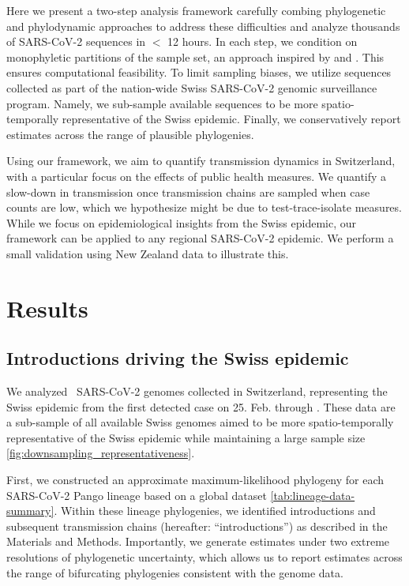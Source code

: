 \documentclass[9pt,twocolumn,twoside,lineno]{pnas-new}
\begin{document}
Here we present a two-step analysis framework carefully combing phylogenetic and phylodynamic approaches to  address these difficulties and analyze thousands of SARS-CoV-2 sequences in $<$ 12 hours. In each step, we condition on monophyletic partitions of the sample set, an approach inspired by  \cite{Muller2020} and \cite{DuPlessis}. This ensures computational feasibility. To limit sampling biases, we utilize sequences collected as part of the nation-wide Swiss SARS-CoV-2 genomic surveillance program. Namely, we sub-sample  available sequences to be more spatio-temporally representative of the Swiss epidemic. Finally, we conservatively report estimates across the range of plausible phylogenies.

Using our framework, we aim to quantify transmission dynamics in Switzerland, with a particular focus on the effects of public health measures. We quantify a slow-down in transmission once transmission chains are sampled when case counts are low, which we hypothesize might be due to test-trace-isolate measures. While we focus on epidemiological insights from the Swiss epidemic, our framework can be applied to any regional SARS-CoV-2 epidemic. We perform a small validation using New Zealand data to illustrate this. 

\section{Results}

\subsection{Introductions driving the Swiss epidemic}

We analyzed \nfocalsamples\ SARS-CoV-2 genomes collected in Switzerland, representing the Swiss epidemic from the first detected case on 25. Feb. through \maxdate. These data are a sub-sample of all available Swiss genomes aimed to be more spatio-temporally representative of the Swiss epidemic while maintaining a large sample size \ref{fig:downsampling_representativeness}. 

First, we constructed an approximate maximum-likelihood phylogeny for each SARS-CoV-2 Pango lineage based on a global dataset \ref{tab:lineage-data-summary}. Within these lineage phylogenies, we identified introductions and subsequent transmission chains (hereafter: ``introductions'') as described in the Materials and Methods. Importantly, we generate estimates under two extreme resolutions of phylogenetic uncertainty, which allows us to report estimates across the range of bifurcating phylogenies consistent with the genome data.
\end{document}
